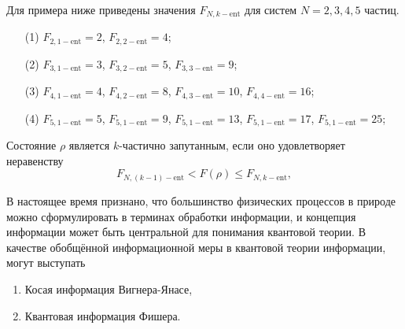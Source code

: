 Для примера ниже приведены значения $F_{N, k-\mathrm{ent}}$ 
для систем $N = 2, 3, 4, 5$ частиц.
\begin{itemize}
  \item[(1)] 
    $F_{2, 1-\mathrm{ent}}= 2$, 
    $F_{2, 2-\mathrm{ent}}= 4$;
  \item[(2)] 
    $F_{3, 1-\mathrm{ent}}= 3$, 
    $F_{3, 2-\mathrm{ent}}= 5$, 
    $F_{3, 3-\mathrm{ent}}= 9$;
  \item[(3)] 
    $F_{4, 1-\mathrm{ent}}= 4$, 
    $F_{4, 2-\mathrm{ent}}= 8$, 
    $F_{4, 3-\mathrm{ent}}= 10$,
    $F_{4, 4-\mathrm{ent}}= 16$; 
  \item[(4)] 
    $F_{5, 1-\mathrm{ent}}= 5$, 
    $F_{5, 1-\mathrm{ent}}= 9$, 
    $F_{5, 1-\mathrm{ent}}= 13$, 
    $F_{5, 1-\mathrm{ent}}= 17$, 
    $F_{5, 1-\mathrm{ent}}= 25$; 
\end{itemize}


\begin{definition}
  Состояние $\rho$ является $k$-частично запутанным,
  если оно удовлетворяет неравенству
  \begin{equation}
    F_{N, (k-1)-\mathrm{ent}} < F(\rho) \leq  F_{N, k-\mathrm{ent}},
  \end{equation}
\end{definition}

В настоящее время признано, 
что большинство физических процессов в природе можно сформулировать в терминах обработки информации, 
и концепция информации может быть центральной для понимания квантовой теории\cite{Wheeler2004, Summhammer2004, Frieden2004}.
В качестве обобщённой информационной меры в квантовой теории информации, 
могут выступать
\begin{enumerate}
  \item Косая информация Вигнера-Янасе\cite{Zeqian2005},
  \item Квантовая информация Фишера\cite{Hyllus2012}.
\end{enumerate}

